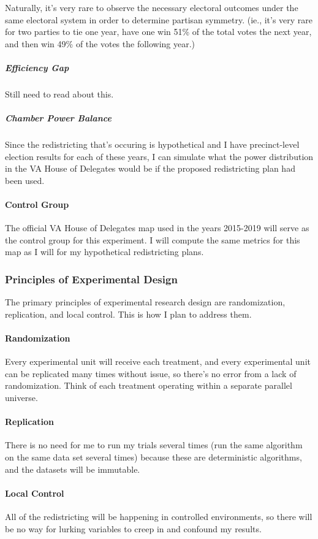 Naturally, it's very rare to observe the necessary electoral outcomes under the same electoral system in order to determine partisan symmetry. (ie., it's very rare for two parties to tie one year, have one win 51\% of the total votes the next year, and then win 49\% of the votes the following year.)



\subparagraph{Efficiency Gap}

Still need to read about this. 

\subparagraph{Chamber Power Balance}

Since the redistricting that's occuring is hypothetical and I have precinct-level election results for each of these years, I can simulate what the power distribution in the VA House of Delegates would be if the proposed redistricting plan had been used. 

\paragraph{Control Group}

The official VA House of Delegates map used in the years 2015-2019 will serve as the control group for this experiment. I will compute the same metrics for this map as I will for my hypothetical redistricting plans. 

\subsubsection{Principles of Experimental Design}

The primary principles of experimental research design are randomization, replication, and local control. This is how I plan to address them. 

\paragraph{Randomization}

Every experimental unit will receive each treatment, and every experimental unit can be replicated many times without issue, so there’s no error from a lack of randomization. Think of each treatment operating within a separate parallel universe. 

\paragraph{Replication}

There is no need for me to run my trials several times (run the same algorithm on the same data set several times) because these are deterministic algorithms, and the datasets will be immutable. 

\paragraph{Local Control}

All of the redistricting will be happening in controlled environments, so there will be no way for lurking variables to creep in and confound my results. 
